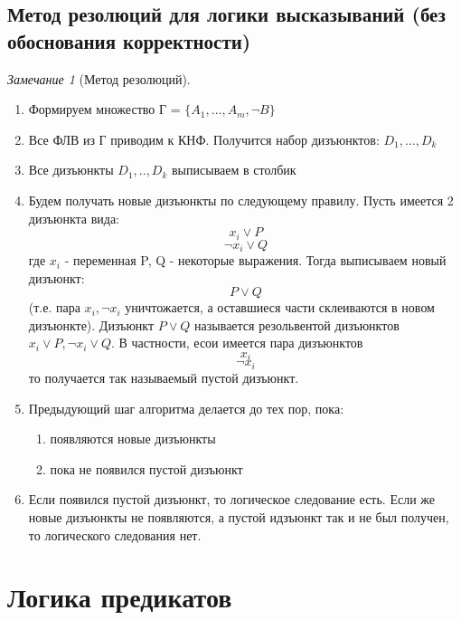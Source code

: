 \documentclass[a4paper]{article}
\theoremstyle{definition}
\theoremstyle{remark}
\newtheorem*{remark}{Замечание}
\begin{document}
    \subsection{Метод резолюций для логики высказываний (без обоснования корректности)}
	\begin{remark}[Метод резолюций]
		\begin{enumerate}
			\item Формируем множество Г = $\{A_1, \dots, A_m, \neg B\}$
			\item Все ФЛВ из Г приводим к КНФ. Получится набор дизъюнктов: $D_1, \dots, D_k$
			\item Все дизъюнкты $D_1, .., D_k$ выписываем в столбик
			\item  Будем получать новые дизъюнкты по следующему правилу. Пусть имеется 2 дизъюнкта вида: $$x_i \vee P$$ $$\neg x_i \vee Q$$
			где $x_i$ - переменная P, Q - некоторые выражения. Тогда выписываем новый дизъюнкт: $$P \vee Q$$
			(т.е. пара $x_i, \neg x_i$ уничтожается, а оставшиеся части склеиваются в новом дизъюнкте). Дизъюнкт $P \vee Q$ называется резольвентой дизъюнктов $x_i \vee P, \neg x_i \vee Q.$ В частности, есои имеется пара дизъюнктов $$x_i$$ $$\neg x_i$$ то получается так называемый пустой дизъюнкт.
			\item Предыдующий шаг алгоритма делается до тех пор, пока:
			\begin{enumerate}
				\item появляются новые дизъюнкты
				\item пока не появился пустой дизъюнкт
			\end{enumerate}
			\item Если появился пустой дизъюнкт, то логическое следование есть. Если же новые дизъюнкты не появляются, а пустой идзъюнкт так и не был получен, то логического следования нет.
		\end{enumerate}
	\end{remark}
    \section{Логика предикатов}
\end{document}

